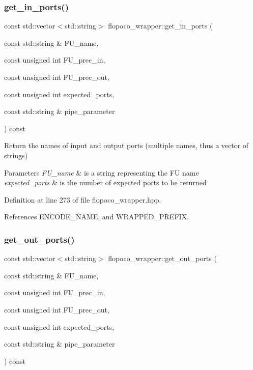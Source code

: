 \subsubsection{\texorpdfstring{get\+\_\+in\+\_\+ports()}{get\_in\_ports()}}
{\footnotesize\ttfamily const std\+::vector$<$std\+::string$>$ flopoco\+\_\+wrapper\+::get\+\_\+in\+\_\+ports (\begin{DoxyParamCaption}\item[{const std\+::string \&}]{F\+U\+\_\+name,  }\item[{const unsigned int}]{F\+U\+\_\+prec\+\_\+in,  }\item[{const unsigned int}]{F\+U\+\_\+prec\+\_\+out,  }\item[{const unsigned int}]{expected\+\_\+ports,  }\item[{const std\+::string \&}]{pipe\+\_\+parameter }\end{DoxyParamCaption}) const\hspace{0.3cm}{\ttfamily [inline]}}



Return the names of input and output ports (multiple names, thus a vector of strings) 


\begin{DoxyParams}{Parameters}
{\em F\+U\+\_\+name} & is a string representing the FU name \\
\hline
{\em expected\+\_\+ports} & is the number of expected ports to be returned \\
\hline
\end{DoxyParams}


Definition at line 273 of file flopoco\+\_\+wrapper.\+hpp.



References E\+N\+C\+O\+D\+E\+\_\+\+N\+A\+ME, and W\+R\+A\+P\+P\+E\+D\+\_\+\+P\+R\+E\+F\+IX.

\mbox{\label{classflopoco__wrapper_ac68016486d105000e2df59fc924eec32}} 
\subsubsection{\texorpdfstring{get\+\_\+out\+\_\+ports()}{get\_out\_ports()}}
{\footnotesize\ttfamily const std\+::vector$<$std\+::string$>$ flopoco\+\_\+wrapper\+::get\+\_\+out\+\_\+ports (\begin{DoxyParamCaption}\item[{const std\+::string \&}]{F\+U\+\_\+name,  }\item[{const unsigned int}]{F\+U\+\_\+prec\+\_\+in,  }\item[{const unsigned int}]{F\+U\+\_\+prec\+\_\+out,  }\item[{const unsigned int}]{expected\+\_\+ports,  }\item[{const std\+::string \&}]{pipe\+\_\+parameter }\end{DoxyParamCaption}) const\hspace{0.3cm}{\ttfamily [inline]}}




